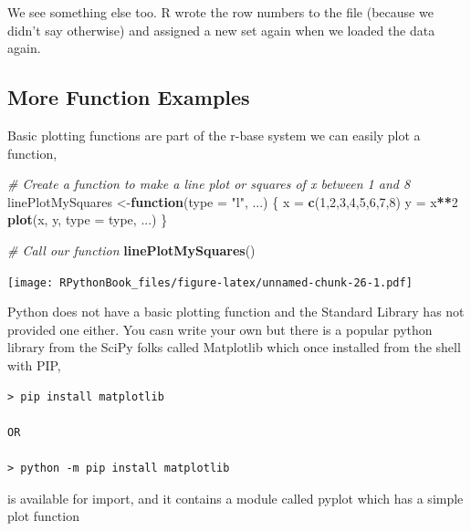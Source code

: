 \documentclass[]{book}
\newenvironment{Shaded}{\begin{snugshade}}{\end{snugshade}}
\newcommand{\KeywordTok}[1]{\textcolor[rgb]{0.13,0.29,0.53}{\textbf{#1}}}
\newcommand{\DataTypeTok}[1]{\textcolor[rgb]{0.13,0.29,0.53}{#1}}
\newcommand{\DecValTok}[1]{\textcolor[rgb]{0.00,0.00,0.81}{#1}}
\newcommand{\StringTok}[1]{\textcolor[rgb]{0.31,0.60,0.02}{#1}}
\newcommand{\CommentTok}[1]{\textcolor[rgb]{0.56,0.35,0.01}{\textit{#1}}}
\newcommand{\ControlFlowTok}[1]{\textcolor[rgb]{0.13,0.29,0.53}{\textbf{#1}}}
\newcommand{\OperatorTok}[1]{\textcolor[rgb]{0.81,0.36,0.00}{\textbf{#1}}}
\newcommand{\NormalTok}[1]{#1}
\theoremstyle{definition}
\theoremstyle{definition}
\theoremstyle{definition}
\theoremstyle{remark}
\begin{document}
We see something else too. R wrote the row numbers to the file (because
we didn't say otherwise) and assigned a new set again when we loaded the
data again.

\subsection{More Function Examples}\label{more-function-examples}

Basic plotting functions are part of the r-base system we can easily
plot a function,

\begin{Shaded}
\begin{Highlighting}[]
\CommentTok{# Create a function to make a line plot or squares of x between 1 and 8}
\NormalTok{linePlotMySquares <-}\ControlFlowTok{function}\NormalTok{(}\DataTypeTok{type =} \StringTok{"l"}\NormalTok{, ...) \{}
\NormalTok{  x =}\StringTok{ }\KeywordTok{c}\NormalTok{(}\DecValTok{1}\NormalTok{,}\DecValTok{2}\NormalTok{,}\DecValTok{3}\NormalTok{,}\DecValTok{4}\NormalTok{,}\DecValTok{5}\NormalTok{,}\DecValTok{6}\NormalTok{,}\DecValTok{7}\NormalTok{,}\DecValTok{8}\NormalTok{)}
\NormalTok{  y =}\StringTok{ }\NormalTok{x}\OperatorTok{**}\DecValTok{2}
  \KeywordTok{plot}\NormalTok{(x, y, }\DataTypeTok{type =}\NormalTok{ type, ...)}
\NormalTok{\}}

\CommentTok{# Call our function}
\KeywordTok{linePlotMySquares}\NormalTok{()}
\end{Highlighting}
\end{Shaded}

\texttt{[image: RPythonBook\_files/figure-latex/unnamed-chunk-26-1.pdf]}

Python does not have a basic plotting function and the Standard Library
has not provided one either. You casn write your own but there is a
popular python library from the SciPy folks called Matplotlib which once
installed from the shell with PIP,

\begin{verbatim}
> pip install matplotlib

OR

> python -m pip install matplotlib
\end{verbatim}

is available for import, and it contains a module called pyplot which
has a simple plot function
\end{document}
